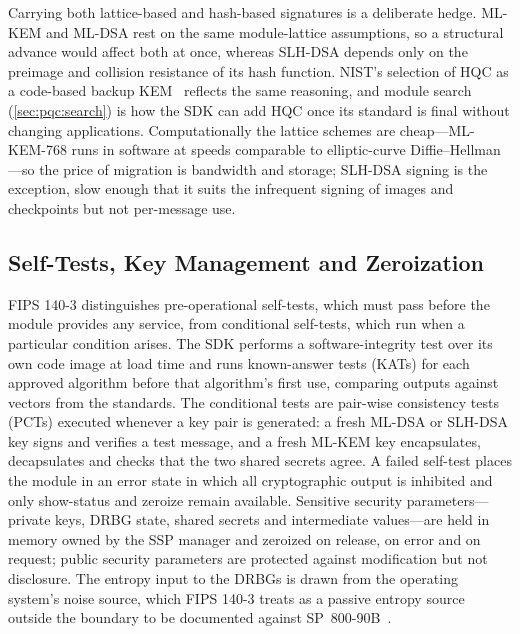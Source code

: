 Carrying both lattice-based and hash-based signatures is a deliberate hedge. ML-KEM and ML-DSA rest on the same module-lattice assumptions, so a structural advance would affect both at once, whereas SLH-DSA depends only on the preimage and collision resistance of its hash function. NIST's selection of HQC as a code-based backup KEM~\cite{nist2025ir8545} reflects the same reasoning, and module search (\cref{sec:pqc:search}) is how the SDK can add HQC once its standard is final without changing applications. Computationally the lattice schemes are cheap---ML-KEM-768 runs in software at speeds comparable to elliptic-curve Diffie--Hellman---so the price of migration is bandwidth and storage; SLH-DSA signing is the exception, slow enough that it suits the infrequent signing of images and checkpoints but not per-message use.

\subsection{Self-Tests, Key Management and Zeroization}\label{sec:pqc:selftests}

FIPS 140-3 distinguishes pre-operational self-tests, which must pass before the module provides any service, from conditional self-tests, which run when a particular condition arises. The SDK performs a software-integrity test over its own code image at load time and runs known-answer tests (KATs) for each approved algorithm before that algorithm's first use, comparing outputs against vectors from the standards. The conditional tests are pair-wise consistency tests (PCTs) executed whenever a key pair is generated: a fresh ML-DSA or SLH-DSA key signs and verifies a test message, and a fresh ML-KEM key encapsulates, decapsulates and checks that the two shared secrets agree. A failed self-test places the module in an error state in which all cryptographic output is inhibited and only show-status and zeroize remain available. Sensitive security parameters---private keys, DRBG state, shared secrets and intermediate values---are held in memory owned by the SSP manager and zeroized on release, on error and on request; public security parameters are protected against modification but not disclosure. The entropy input to the DRBGs is drawn from the operating system's noise source, which FIPS 140-3 treats as a passive entropy source outside the boundary to be documented against SP~800-90B~\cite{nist2018sp80090b}.

